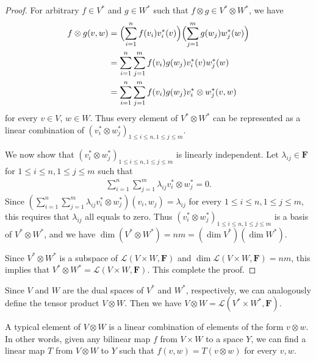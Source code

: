 \begin{proof}
    For arbitrary $f \in V^*$ and $g \in W^*$ such that $f \otimes g \in V^* \otimes W^*$, we have
    \begin{align*}
        f \otimes g(v, w)
        &= \Bigl(\sum_{i = 1}^{n}f(v_i)v_i^*(v)\Bigr)\Bigl(\sum_{j = 1}^{m}g(w_j)w_j^*(w)\Bigr)\\
        &= \sum_{i = 1}^{n}\sum_{j = 1}^{m}f(v_i)g(w_j)v_i^*(v)w_j^*(w)\\
        &= \sum_{i = 1}^{n}\sum_{j = 1}^{m}f(v_i)g(w_j) v_i^*\otimes w_j^*(v, w)
    \end{align*}
    for every $v \in V$, $w \in W$. Thus every element of $V^* \otimes W^*$ can be represented as a linear combination of $(v_i^* \otimes w_j^*)_{1 \leq i \leq n, 1 \leq j \leq m}$.
    
    We now show that $(v_i^* \otimes w_j^*)_{1 \leq i \leq n, 1 \leq j \leq m}$ is linearly independent. Let $\lambda_{ij} \in \mathbf{F}$ for $1 \leq i \leq n, 1 \leq j \leq m$ such that
    \begin{align*}
        \sum_{i = 1}^{n}\sum_{j = 1}^{m}\lambda_{ij}v_i^* \otimes w_j^* = 0.
    \end{align*}
    Since $(\sum_{i = 1}^{n}\sum_{j = 1}^{m}\lambda_{ij}v_i^* \otimes w_j^*)(v_i, w_j) = \lambda_{ij}$ for every $1 \leq i \leq n, 1 \leq j \leq m$, this requires that $\lambda_{ij}$ all equals to zero. Thus $(v_i^* \otimes w_j^*)_{1 \leq i \leq n, 1 \leq j \leq m}$ is a basis of $V^* \otimes W^*$, and we have $\dim(V^* \otimes W^*) = nm = (\dim{V^*})(\dim{W^*})$.

    Since $V^* \otimes W^*$ is a subspace of $\mathcal{L}(V \times W, \mathbf{F})$ and $\dim{\mathcal{L}(V \times W, \mathbf{F})} = nm$, this implies that $V^* \otimes W^* = \mathcal{L}(V \times W, \mathbf{F})$. This complete the proof.
\end{proof}

\begin{remark}
    Since $V$ and $W$ are the dual spaces of $V^*$ and $W^*$, respectively, we can analogously define the tensor product $V \otimes W$. Then we have $V \otimes W = \mathcal{L}(V^* \times W^*, \mathbf{F})$.
\end{remark}

A typical element of $V \otimes W$ is a linear combination of elements of the form $v \otimes w$. In other words, given any bilinear map $f$ from $V \times W$ to a space $Y$, we can find a linear map $T$ from $V \otimes W$ to $Y$ such that $f(v, w) = T(v \otimes w)$ for every $v,w$.

